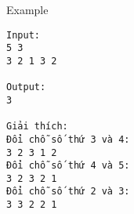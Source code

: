 Example
\begin{verbatim}
Input:
5 3
3 2 1 3 2

Output:
3

Giải thích:
Đổi chỗ số thứ 3 và 4:
3 2 3 1 2
Đổi chỗ số thứ 4 và 5:
3 2 3 2 1
Đổi chỗ số thứ 2 và 3:
3 3 2 2 1
\end{verbatim}